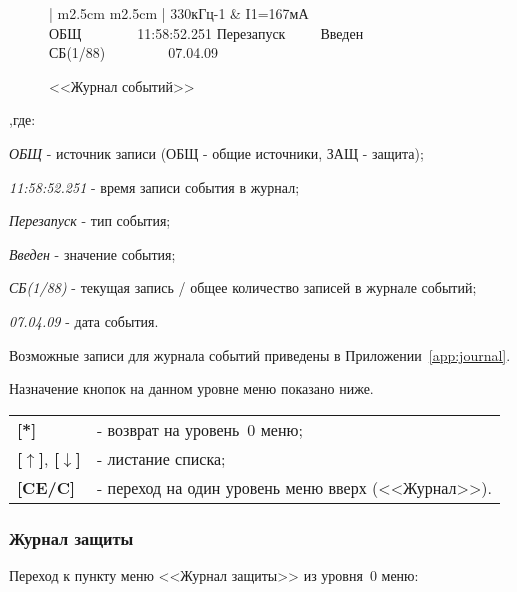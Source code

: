  \begin{figure}[H]
 	\centering
 	
	\begin{tabular}{| m{2.5cm}  m{2.5cm} |}
		\firsthline
		330кГц-1	& \raggedleft I1=167мА				\tabularnewline 
		 {ОБЩ~~~~~~~~11:58:52.251} 	\tabularnewline
		  {Перезапуск~~~~~Введен} 	\tabularnewline 
		 {СБ(1/88)~~~~~~~~~07.04.09}\tabularnewline 
		\lasthline
	\end{tabular} 
	
	\caption{<<Журнал событий>>}
	\label{fig:journal_event}
\end{figure}

\begin{ESKDexplanation}[1.5cm]
	\item[,где:]
	\item \textit{ОБЩ} - источник записи (ОБЩ - общие источники, ЗАЩ - защита);
	\item \textit{11:58:52.251} - время записи события в журнал;
	\item \textit{Перезапуск} - тип события;
	\item \textit{Введен} - значение события;
	\item \textit{СБ(1/88)} - текущая запись / общее количество записей в журнале событий;
	\item \textit{07.04.09} - дата события.
\end{ESKDexplanation}

Возможные записи для журнала событий приведены в Приложении~\ref{app:journal}.

Назначение кнопок на данном уровне меню показано ниже.
\begin{center}
	\begin{tabular}{p{2cm} p{15cm}}
		\textbf{[*]} & - возврат на уровень~0 меню; \tabularnewline
		\textbf{[$\uparrow$]}, \textbf{[$\downarrow$]}  & - листание списка; \tabularnewline
		\textbf{[CE/C]} & - переход на один уровень меню вверх (<<Журнал>>). \tabularnewline				
	\end{tabular}
\end{center} 


\subsubsection{Журнал защиты} \label{sssec:journal_def}

Переход к пункту меню <<Журнал защиты>> из уровня~0 меню: 

